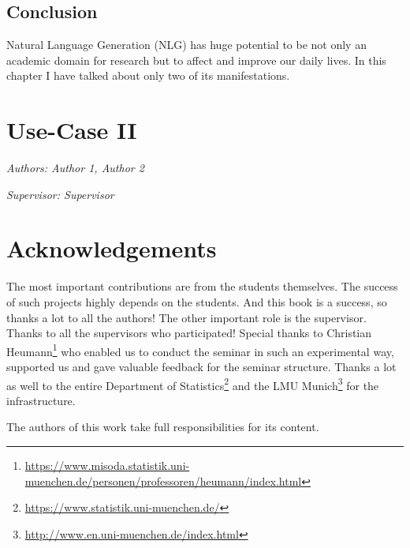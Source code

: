\documentclass[]{krantz}
\renewcommand{\href}[2]{#2\footnote{\url{#1}}}
\begin{document}
\hypertarget{conclusion-2}{%
\section{Conclusion}\label{conclusion-2}}

Natural Language Generation (NLG) has huge potential to be not only an academic domain for research but to affect and improve our daily lives. In this chapter I have talked about only two of its manifestations.

\hypertarget{use-case-ii}{%
\chapter{Use-Case II}\label{use-case-ii}}

\emph{Authors: Author 1, Author 2}

\emph{Supervisor: Supervisor}

\hypertarget{acknowledgements}{%
\chapter{Acknowledgements}\label{acknowledgements}}

The most important contributions are from the students themselves.
The success of such projects highly depends on the students.
And this book is a success, so thanks a lot to all the authors!
The other important role is the supervisor.
Thanks to all the supervisors who participated!
Special thanks to \href{https://www.misoda.statistik.uni-muenchen.de/personen/professoren/heumann/index.html}{Christian Heumann} who enabled us to conduct the seminar in such an experimental way, supported us and gave valuable feedback for the seminar structure.
Thanks a lot as well to the entire \href{https://www.statistik.uni-muenchen.de/}{Department of Statistics} and the \href{http://www.en.uni-muenchen.de/index.html}{LMU Munich} for the infrastructure.

The authors of this work take full responsibilities for its content.



\backmatter
\printindex
\end{document}
